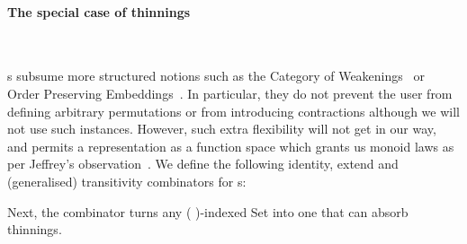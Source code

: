 \paragraph*{The special case of thinnings}~

\begin{agdasnippet}
\end{agdasnippet}

s subsume more structured notions such as the Category of
Weakenings~\cite{altenkirch1995categorical} or Order Preserving
Embeddings~\cite{chapman2009type}. In particular, they do not prevent the
user from defining arbitrary permutations or from introducing contractions
although we will not use such instances. However, such extra flexibility
will not get in our way, and permits a representation as a function space
which grants us monoid laws  as per Jeffrey's
observation~\citeyear{jeffrey2011assoc}. We define the following identity, extend and (generalised) transitivity combinators for s:

\noindent
\begin{minipage}{0.95\textwidth}
\begin{minipage}{0.45\textwidth}
\end{minipage}
\begin{minipage}{0.45\textwidth}
\end{minipage}
\end{minipage}


Next, the  combinator turns any ( )-indexed Set into one that can
absorb thinnings.

